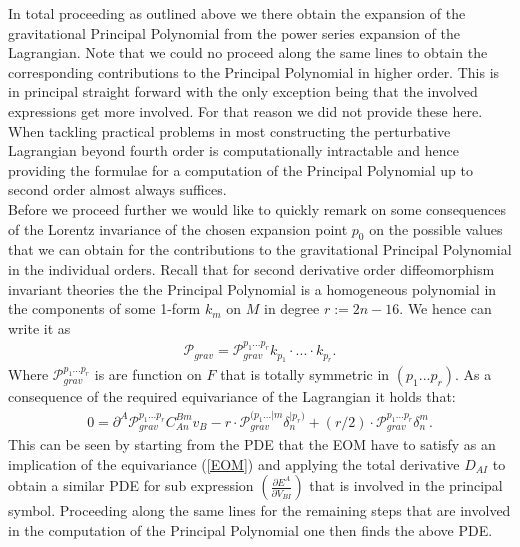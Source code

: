 \documentclass[a4paper,12pt, DIV=14, BCOR=5mm, twoside, headsepline, numbers=noenddot]{scrbook}
\begin{document}
In total proceeding as outlined above we there obtain the expansion of the gravitational Principal Polynomial from the power series expansion of the Lagrangian.
Note that we could no proceed along the same lines to obtain the corresponding contributions to the Principal Polynomial in higher order. This is in principal straight forward with the only exception being that the involved expressions get more involved. For that reason we did not provide these here. When tackling practical problems in most constructing the perturbative Lagrangian beyond fourth order is computationally intractable and hence providing the formulae for a computation of the Principal Polynomial up to second order almost always suffices.\\
Before we proceed further we would like to quickly remark on some consequences of the Lorentz invariance of the chosen expansion point $p_0$ on the possible values that we can obtain for the contributions to the gravitational Principal Polynomial in the individual orders. Recall that for second derivative order diffeomorphism invariant theories the the Principal Polynomial is a homogeneous polynomial in the components of some 1-form $k_m$ on $M$ in degree $r := 2n-16$. We hence can write it as 
\begin{align}
    \mathcal{P}_{grav} = \mathcal{P}_{grav}^{{p_1}...{p_{r}}} k_{p_1} \cdot ... \cdot k_{p_r}.
\end{align}
Where $\mathcal{P}_{grav}^{{p_1}...{p_r}}$ is are function on $F$ that is totally symmetric in $(p_1...p_r)$. As a consequence of the required equivariance of the Lagrangian it holds that:
\begin{align}\label{polyEqn}
    0 = \partial^A\mathcal{P}_{grav}^{{p_1}...{p_r}}C_{An}^{Bm}v_B - r \cdot \mathcal{P}_{grav}^{({p_1}...\vert m} \delta_{n}^{\vert p_r) }  + (r/2) \cdot \mathcal{P}_{grav}^{{p_1}...{p_r}} \delta^m_n.
\end{align}
%
%
%
This can be seen by starting from the PDE that the EOM have to satisfy as an implication of the equivariance (\ref{EOM}) and applying the total derivative $D_{AI}$ to obtain a similar PDE for sub expression $\left ( \frac{\partial E^A}{\partial V_{BI}} \right )$ that is involved in the principal symbol. Proceeding along the same lines for the remaining steps that are involved in the computation of the Principal Polynomial one then finds the above PDE. \\
\end{document}
